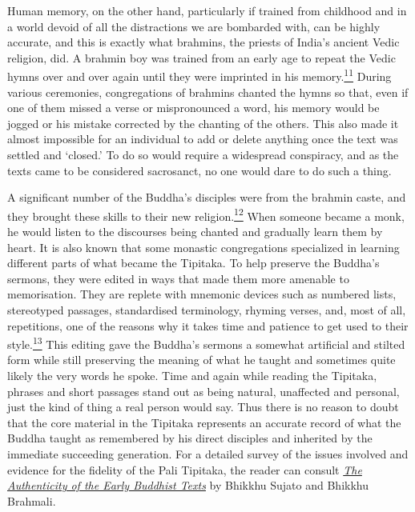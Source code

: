 Human memory, on the other hand, particularly if trained from childhood
and in a world devoid of all the distractions we are bombarded with, can
be highly accurate, and this is exactly what brahmins, the priests of
India's ancient Vedic religion, did. A brahmin boy was trained from an
early age to repeat the Vedic hymns over and over again until they were
imprinted in his
memory.\label{footprints_split_005.html_fnref11}\hyperref[footprints_split_024.htmlux5cux23fn11]{\textsuperscript{11}}
During various ceremonies, congregations of brahmins chanted the hymns
so that, even if one of them missed a verse or mispronounced a word, his
memory would be jogged or his mistake corrected by the chanting of the
others. This also made it almost impossible for an individual to add or
delete anything once the text was settled and `closed.' To do so would
require a widespread conspiracy, and as the texts came to be considered
sacrosanct, no one would dare to do such a thing.

A significant number of the Buddha's disciples were from the brahmin
caste, and they brought these skills to their new
religion.\label{footprints_split_005.html_fnref12}\hyperref[footprints_split_024.htmlux5cux23fn12]{\textsuperscript{12}}
When someone became a monk, he would listen to the discourses being
chanted and gradually learn them by heart. It is also known that some
monastic congregations specialized in learning different parts of what
became the Tipitaka. To help preserve the Buddha's sermons, they were
edited in ways that made them more amenable to memorisation. They are
replete with mnemonic devices such as numbered lists, stereotyped
passages, standardised terminology, rhyming verses, and, most of all,
repetitions, one of the reasons why it takes time and patience to get
used to their
style.\label{footprints_split_005.html_fnref13}\hyperref[footprints_split_024.htmlux5cux23fn13]{\textsuperscript{13}}
This editing gave the Buddha's sermons a somewhat artificial and stilted
form while still preserving the meaning of what he taught and sometimes
quite likely the very words he spoke. Time and again while reading the
Tipitaka, phrases and short passages stand out as being natural,
unaffected and personal, just the kind of thing a real person would say.
Thus there is no reason to doubt that the core material in the Tipitaka
represents an accurate record of what the Buddha taught as remembered by
his direct disciples and inherited by the immediate succeeding
generation. For a detailed survey of the issues involved and evidence
for the fidelity of the Pali Tipitaka, the reader can consult
\href{https://wiswo.org/books/auth}{\emph{The Authenticity of the Early
Buddhist Texts}} by Bhikkhu Sujato and Bhikkhu Brahmali.

